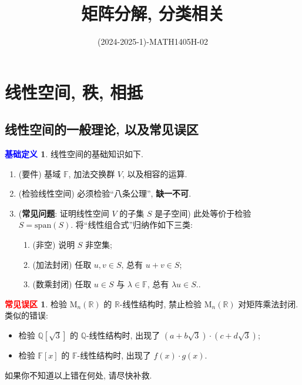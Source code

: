 \documentclass[11pt]{ctexart}
\title{矩阵分解, 分类相关}
\author{(2024-2025-1)-MATH1405H-02}
\theoremstyle{definition}
\numberwithin{equation}{section}
\theoremstyle{definition}
\newtheorem*{definition}{\textcolor{blue}{基础定义}}
\newtheorem*{warning}{\textcolor{red}{常见误区}}
\theoremstyle{remark}
\begin{document}
\maketitle

\LARGE


\newpage

\section{线性空间, 秩, 相抵}

\subsection{线性空间的一般理论, 以及常见误区}

\begin{definition}
    线性空间的基础知识如下. 
    \begin{enumerate}
        \item (要件) 基域 $\mathbb F$, 加法交换群 $V$, 以及相容的运算. 
        \item (检验线性空间) 必须检验``八条公理'', \textbf{缺一不可}. 
        \item (\textbf{常见问题}: 证明线性空间 $V$ 的子集 $S$ 是子空间) 此处等价于检验 $S=\mathrm{span}(S)$. 将``线性组合式''归纳作如下三类: 
        \begin{enumerate}
            \item (非空) 说明 $S$ 非空集; 
            \item (加法封闭) 任取 $u,v\in S$, 总有 $u+v\in S$; 
            \item (数乘封闭) 任取 $u\in S$ 与 $\lambda \in \mathbb F$, 总有 $\lambda u\in S$.. 
        \end{enumerate}
    \end{enumerate}
\end{definition}

\begin{warning}
    检验 $\mathrm M_n (\mathbb R)$ 的 $\mathbb R$-线性结构时, 禁止检验 $\mathrm M_n(\mathbb R)$ 对矩阵乘法封闭. 类似的错误: 
    \begin{itemize}
        \item 检验 $\mathbb Q[\sqrt 3]$ 的 $\mathbb Q$-线性结构时, 出现了 $(a+b\sqrt 3)\cdot (c+d\sqrt 3)$; 
        \item 检验 $\mathbb F[x]$ 的 $\mathbb F$-线性结构时, 出现了 $f(x)\cdot g(x)$. 
    \end{itemize}
    如果你不知道以上错在何处, 请尽快补救. 
\end{warning}
\end{document}
